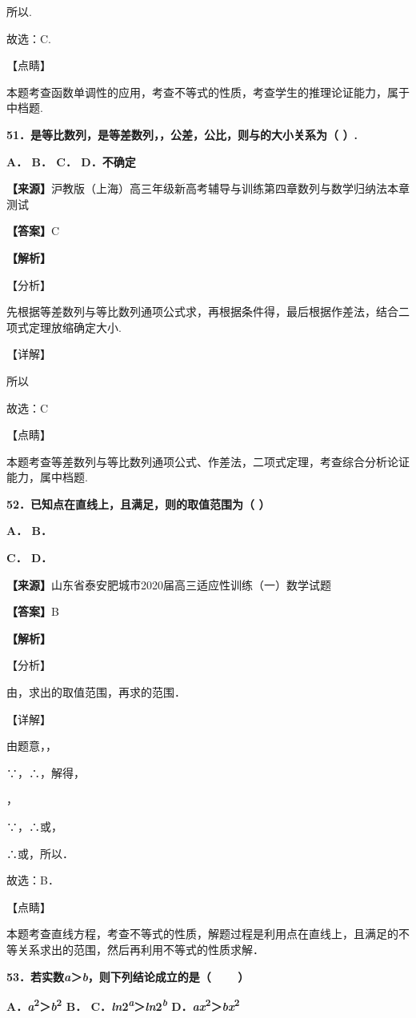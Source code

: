 所以.

故选：C.

【点睛】

本题考查函数单调性的应用，考查不等式的性质，考查学生的推理论证能力，属于中档题.

\textbf{51．是等比数列，是等差数列，，公差，公比，则与的大小关系为（
）.}

\textbf{A． B． C． D．不确定}

\textbf{【来源】}沪教版（上海）高三年级新高考辅导与训练第四章数列与数学归纳法本章测试

\textbf{【答案】}C

\textbf{【解析】}

【分析】

先根据等差数列与等比数列通项公式求，再根据条件得，最后根据作差法，结合二项式定理放缩确定大小.

【详解】

所以

故选：C

【点睛】

本题考查等差数列与等比数列通项公式、作差法，二项式定理，考查综合分析论证能力，属中档题.

\textbf{52．已知点在直线上，且满足，则的取值范围为（ ）}

\textbf{A． B．}

\textbf{C． D．}

\textbf{【来源】}山东省泰安肥城市2020届高三适应性训练（一）数学试题

\textbf{【答案】}B

\textbf{【解析】}

【分析】

由，求出的取值范围，再求的范围．

【详解】

由题意，，

∵，∴，解得，

，

∵，∴或，

∴或，所以．

故选：B．

【点睛】

本题考查直线方程，考查不等式的性质，解题过程是利用点在直线上，且满足的不等关系求出的范围，然后再利用不等式的性质求解．

\textbf{53．若实数\emph{a}＞\emph{b}，则下列结论成立的是（ 　　）}

\textbf{A．\emph{a}\textsuperscript{2}＞\emph{b}\textsuperscript{2} B．
C．\emph{ln}2\emph{\textsuperscript{a}}＞\emph{ln}2\emph{\textsuperscript{b}}
D．\emph{ax}\textsuperscript{2}＞\emph{bx}\textsuperscript{2}}

